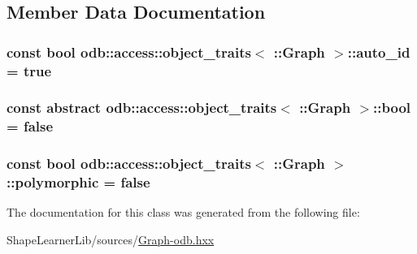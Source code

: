 \subsection{Member Data Documentation}
\hypertarget{classodb_1_1access_1_1object__traits_3_01_1_1_graph_01_4_a3013c024c91b6a5de4b94ecf10972c01}{}
\subsubsection[{auto\+\_\+id}]{\setlength{\rightskip}{0pt plus 5cm}const {\bf bool} odb\+::access\+::object\+\_\+traits$<$ \+::{\bf Graph} $>$\+::auto\+\_\+id = true\hspace{0.3cm}{\ttfamily [static]}}\label{classodb_1_1access_1_1object__traits_3_01_1_1_graph_01_4_a3013c024c91b6a5de4b94ecf10972c01}
\hypertarget{classodb_1_1access_1_1object__traits_3_01_1_1_graph_01_4_a2f6665ffbf77fb06f9a323ac98c30983}{}
\subsubsection[{bool}]{\setlength{\rightskip}{0pt plus 5cm}const abstract odb\+::access\+::object\+\_\+traits$<$ \+::{\bf Graph} $>$\+::bool = false\hspace{0.3cm}{\ttfamily [static]}}\label{classodb_1_1access_1_1object__traits_3_01_1_1_graph_01_4_a2f6665ffbf77fb06f9a323ac98c30983}
\hypertarget{classodb_1_1access_1_1object__traits_3_01_1_1_graph_01_4_a7de852e6c8989c2697e747a23e3566e7}{}
\subsubsection[{polymorphic}]{\setlength{\rightskip}{0pt plus 5cm}const {\bf bool} odb\+::access\+::object\+\_\+traits$<$ \+::{\bf Graph} $>$\+::polymorphic = false\hspace{0.3cm}{\ttfamily [static]}}\label{classodb_1_1access_1_1object__traits_3_01_1_1_graph_01_4_a7de852e6c8989c2697e747a23e3566e7}


The documentation for this class was generated from the following file\+:\begin{DoxyCompactItemize}
\item 
Shape\+Learner\+Lib/sources/\hyperlink{_graph-odb_8hxx}{Graph-\/odb.\+hxx}\end{DoxyCompactItemize}
